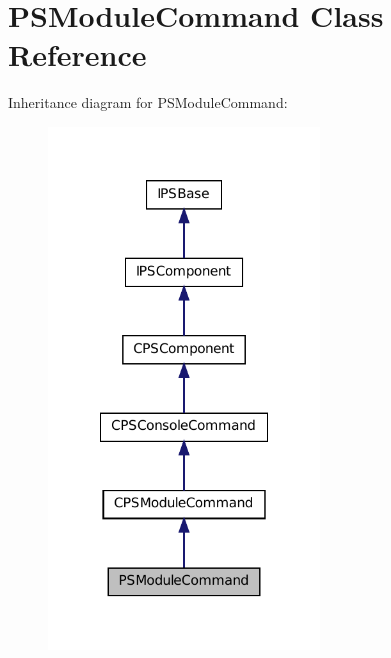 \hypertarget{classPSModuleCommand}{
\section{PSModuleCommand Class Reference}
\label{classPSModuleCommand}
}


Inheritance diagram for PSModuleCommand:\nopagebreak
\begin{figure}[H]
\begin{center}
\leavevmode
\includegraphics[width=204pt]{classPSModuleCommand__inherit__graph}
\end{center}
\end{figure}


